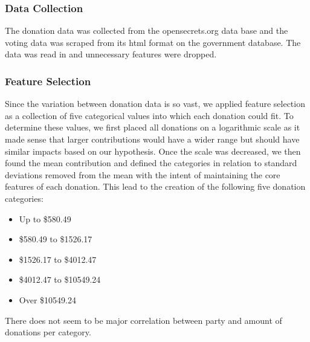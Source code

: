 \documentclass[journal]{IEEEtran}
\begin{document}
 \subsubsection{Data Collection} 
 The donation data was collected from the opensecrets.org data base and the voting data was scraped from its
 html format on the government database. The data was read in and unnecessary features were dropped.
 \subsubsection{Feature Selection} 
 Since the variation between donation data is so vast, we applied feature selection as a collection of five
 categorical values into which each donation could fit. To determine these values, we first placed all donations on a logarithmic scale
 as it made sense that larger contributions would have a wider range but should have similar impacts based on our hypothesis. Once
 the scale was decreased, we then found the mean contribution and defined the categories in relation to standard deviations removed 
 from the mean with the intent of maintaining the core features of each donation. This lead to the creation of the following five 
 donation categories:
 \begin{itemize}
  \item Up to \$580.49
  \item \$580.49 to \$1526.17
  \item \$1526.17 to \$4012.47
  \item \$4012.47 to \$10549.24
  \item Over \$10549.24
 \end{itemize}
 There does not seem to be major correlation between party and amount of donations per category\footnotemark.\\
\end{document}
